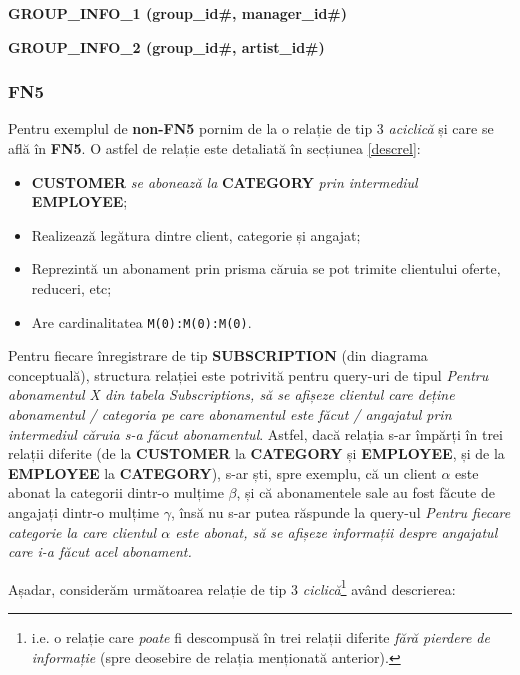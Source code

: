 \documentclass[a4paper, oneside, 12pt]{article}
\begin{document}
\begin{m_itemize}
        \item \textbf{GROUP\_INFO\_1 (group\_id\#, manager\_id\#)}
        \item \textbf{GROUP\_INFO\_2 (group\_id\#, artist\_id\#)}
\end{m_itemize}

\subsubsection{\textbf{FN5}}

Pentru exemplul de \textbf{non-FN5} pornim de la o relație de tip 3
\emph{aciclică} și care se află în \textbf{FN5}. O astfel de relație este
detaliată în secțiunea \ref{descrel}:

\begin{itemize}[label=\textbullet, noitemsep, topsep=0pt, after=]

\item \textbf{CUSTOMER} \emph{se abonează la} \textbf{CATEGORY} \emph{prin intermediul} \textbf{EMPLOYEE};
      \item Realizează legătura dintre client, categorie și angajat;
      \item Reprezintă un abonament prin prisma căruia se pot trimite clientului oferte, reduceri, etc;
      \item Are cardinalitatea \texttt{M(0):M(0):M(0)}.

\end{itemize}

Pentru fiecare înregistrare de tip \textbf{SUBSCRIPTION} (din diagrama
conceptuală), structura relației este potrivită pentru query-uri de tipul
\emph{Pentru abonamentul X din tabela Subscriptions, să se afișeze clientul
care deține abonamentul / categoria pe care abonamentul este făcut / angajatul
prin intermediul căruia s-a făcut abonamentul}. Astfel, dacă relația s-ar
împărți în trei relații diferite (de la \textbf{CUSTOMER} la \textbf{CATEGORY}
și \textbf{EMPLOYEE}, și de la \textbf{EMPLOYEE} la \textbf{CATEGORY}), s-ar
ști, spre exemplu, că un client $\alpha$ este abonat la categorii dintr-o mulțime
$\beta$, și că abonamentele sale au fost făcute de angajați dintr-o mulțime
$\gamma$, însă nu s-ar putea răspunde la query-ul \emph{Pentru fiecare
categorie la care clientul $\alpha$ este abonat, să se afișeze informații
despre angajatul care i-a făcut acel abonament.}

Așadar, considerăm următoarea relație de tip 3 \emph{ciclică}\footnote{i.e. o
relație care \emph{poate} fi descompusă în trei relații diferite \emph{fără
pierdere de informație} (spre deosebire de relația menționată anterior).} având
descrierea:
\end{document}
